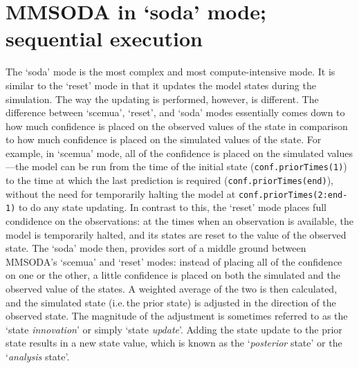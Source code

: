 
\section{MMSODA in `soda' mode; sequential execution}
\label{sec:soda-mode}



The `soda' mode is the most complex and most compute-intensive mode. It is similar to the `reset' mode in that it updates the model states during the simulation. The way the updating is performed, however, is different. The difference between `scemua', `reset', and `soda' modes essentially comes down to how much confidence is placed on the observed values of the state in comparison to how much confidence is placed on the simulated values of the state. For example, in `scemua' mode, all of the confidence is placed on the simulated values---the model can be run from the time of the initial state (\texttt{conf.priorTimes(1)}) to the time at which the last prediction is required (\texttt{conf.priorTimes(end)}), without the need for temporarily halting the model at \texttt{conf.priorTimes(2:end-1)} to do any state updating. In contrast to this, the `reset' mode places full condidence on the observations: at the times when an observation is available, the model is temporarily halted, and its states are reset to the value of the observed state. The `soda' mode then, provides sort of a middle ground between MMSODA's `scemua' and `reset' modes: instead of placing all of the confidence on one or the other, a little confidence is placed on both the simulated and the observed value of the states. A weighted average of the two is then calculated, and the simulated state (i.e.\,the prior state) is adjusted in the direction of the observed state. The magnitude of the adjustment is sometimes referred to as the `state \textit{innovation}' or simply `state \textit{update}'. Adding the state update to the prior state results in a new state value, which is known as the `\textit{posterior} state' or the `\textit{analysis} state'.

